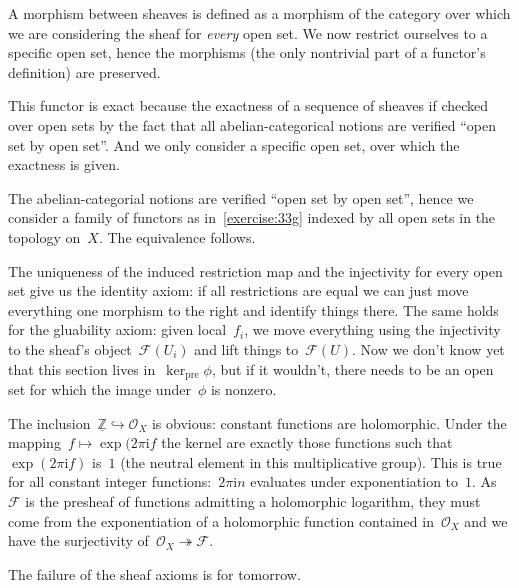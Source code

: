 \begin{exercise}
  \label{exercise:33g}
  A morphism between sheaves is defined as a morphism of the category over which we are considering the sheaf for \emph{every} open set. We now restrict ourselves to a specific open set, hence the morphisms (the only nontrivial part of a functor's definition) are preserved. 

  This functor is exact because the exactness of a sequence of sheaves if checked over open sets by the fact that all abelian-categorical notions are verified ``open set by open set''. And we only consider a specific open set, over which the exactness is given.
\end{exercise}

\begin{exercise}
  The abelian-categorial notions are verified ``open set by open set'', hence we consider a family of functors as in~\autoref{exercise:33g} indexed by all open sets in the topology on~$X$. The equivalence follows.
\end{exercise}

\begin{exercise} %
  The uniqueness of the induced restriction map and the injectivity for every open set give us the identity axiom: if all restrictions are equal we can just move everything one morphism to the right and identify things there. The same holds for the gluability axiom: given local~$f_i$, we move everything using the injectivity to the sheaf's object~$\mathcal{F}(U_i)$ and lift things to~$\mathcal{F}(U)$. Now we don't know yet that this section lives in~$\ker_{\textrm{pre}}\phi$, but if it wouldn't, there needs to be an open set for which the image under~$\phi$ is nonzero. %
\end{exercise}

\begin{exercise} %
  The inclusion~$\underline{\mathbb{Z}}\hookrightarrow\mathcal{O}_X$ is obvious: constant functions are holomorphic. Under the mapping~$f\mapsto\exp(2\pi\mathrm{i}f$ the kernel are exactly those functions such that~$\exp(2\pi\mathrm{i}f)$ is~$1$ (the neutral element in this multiplicative group). This is true for all constant integer functions:~$2\pi\mathrm{i}n$ evaluates under exponentiation to~$1$. As~$\mathcal{F}$ is the presheaf of functions admitting a holomorphic logarithm, they must come from the exponentiation of a holomorphic function contained in~$\mathcal{O}_X$ and we have the surjectivity of~$\mathcal{O}_X\twoheadrightarrow\mathcal{F}$.

  The failure of the sheaf axioms is for tomorrow.
\end{exercise}


